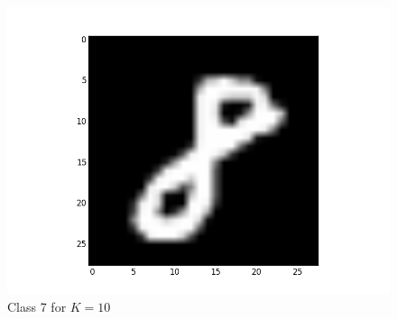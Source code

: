 \documentclass[submit]{harvardml}
\begin{document}
\begin{figure}[ht]
    \includegraphics[scale=0.20]{representative-6-2}
    \caption{Class 7 for $K=10$}
\end{figure}
\end{document}
